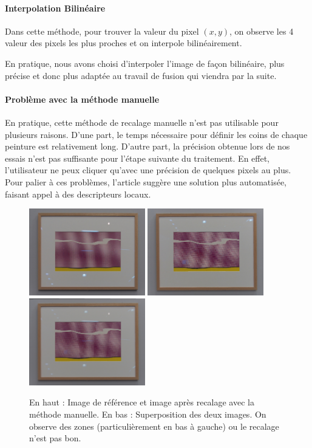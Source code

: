 \documentclass[12pt,a4paper]{article}
\begin{document}
\paragraph{Interpolation Bilinéaire}
Dans cette méthode, pour trouver la valeur du pixel $(x,y)$, on observe les 4 valeur des pixels les plus proches et on interpole bilinéairement.

En pratique, nous avons choisi d'interpoler l'image de façon bilinéaire, plus précise et donc plus adaptée au travail de fusion qui viendra par la suite.

\paragraph{Problème avec la méthode manuelle}

En pratique, cette méthode de recalage manuelle n'est pas utilisable pour plusieurs raisons. D'une part, le temps nécessaire pour définir les coins de chaque peinture est relativement long. D'autre part, la précision obtenue lors de nos essais n'est pas suffisante pour l'étape suivante du traitement. En effet, l'utilisateur ne peux cliquer qu'avec une précision de quelques pixels au plus. Pour palier à ces problèmes, l'article suggère une solution plus automatisée, faisant appel à des descripteurs locaux.
\begin{figure}[H]
  \centering
  \includegraphics[width=0.45\textwidth]{Fig/User_reference.png}
  \includegraphics[width=0.45\textwidth]{Fig/User_fitted.png}\\ \vspace{0.1cm}
  \includegraphics[width=0.45\textwidth]{Fig/User_average.png}

  \caption{En haut : Image de référence et image après recalage avec la méthode manuelle. En bas : Superposition des deux images. On observe des zones (particulièrement en bas à gauche) ou le recalage n'est pas bon.}
\end{figure}
\end{document}
